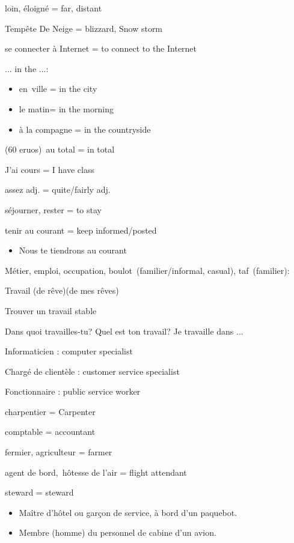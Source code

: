 {loin, éloigné = far, distant}

{Tempête De Neige = blizzard, Snow storm}

{se connecter à Internet = to connect to the Internet}

{... in the ...:}

\begin{itemize}
\item
  {en~}{ville = in the city}
\item
  {le matin}{= in the morning}
\item
  {à la compagne = in the countryside}{~}
\end{itemize}

{(60 eruos)~}{au total = in total}

{J'ai cours = I have class}

{assez adj. = quite/fairly adj.}

{séjourner, rester = to stay}

{tenir au courant = keep informed/posted}

\begin{itemize}
\item
  {Nous te tiendrons au courant}
\end{itemize}

{Métier, emploi, occupation, boulot~}{(familier/informal, casual),
taf~}{(familier)}{:}

{Travail (de rêve)(de mes rêves)}

{Trouver un travail stable~}

{Dans quoi} {travailles-tu? Quel est ton travail? Je travaille dans ...}

{Informaticien : computer specialist}

{Chargé de clientèle : customer service specialist~}

{Fonctionnaire : public service worker}

{charpentier = Carpenter}

{comptable = accountant}

{fermier, agriculteur = farmer}

agent de bord,~hôtesse de l'air = flight attendant

steward = steward

\begin{itemize}
\item
  Maître d'hôtel ou garçon de service, à bord d'un paquebot.
\item
  Membre (homme) du personnel de cabine d'un avion.
\end{itemize}

